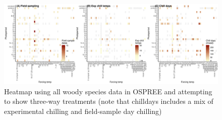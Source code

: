 \documentclass[11pt,letter]{article}
\begin{document}
\begin{figure}[t!]
\centering
\includegraphics[width=1\textwidth]{..//..//analyses/limitingcues/figures/heatallosp_3treats.pdf}
\caption{Heatmap using all woody species data in OSPREE and attempting to show three-way treatments (note that chilldays includes a mix of experimental chilling and field-sample day chilling)}
  \label{fig:heatmap3p}
\end{figure}
\end{document}
